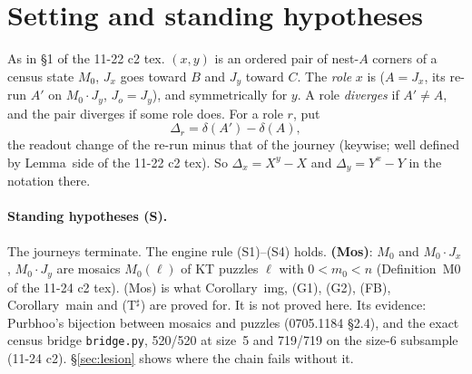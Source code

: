 \documentclass[11pt]{article}
\theoremstyle{definition}\newtheorem{definition}[theorem]{Definition}\newtheorem{remark}[theorem]{Remark}
\begin{document}
\section{Setting and standing hypotheses}\label{sec:set}
As in \S1 of the 11-22 c2 tex. $(x,y)$ is an ordered pair of nest-$A$ corners of a census state $M_0$, $J_x$ goes toward $B$ and $J_y$ toward $C$. The \emph{role} $x$ is ($A=J_x$, its re-run $A'$ on $M_0\cdot J_y$, $J_o=J_y$), and symmetrically for $y$. A role \emph{diverges} if $A'\ne A$, and the pair diverges if some role does. For a role $r$, put
\[\Delta_r=\delta(A')-\delta(A),\]
the readout change of the re-run minus that of the journey (keywise; well defined by Lemma~side of the 11-22 c2 tex). So $\Delta_x=X^y-X$ and $\Delta_y=Y^x-Y$ in the notation there.
\paragraph{Standing hypotheses (S).} The journeys terminate. The engine rule (S1)--(S4) holds. \textbf{(Mos)}: $M_0$ and $M_0\cdot J_x$, $M_0\cdot J_y$ are mosaics $M_0(\ell)$ of KT puzzles $\ell$ with $0<m_0<n$ (Definition~M0 of the 11-24 c2 tex). (Mos) is what Corollary~img, (G1), (G2), (FB), Corollary~main and (T$^\sharp$) are proved for. It is not proved here. Its evidence: Purbhoo's bijection between mosaics and puzzles (0705.1184 \S2.4), and the exact census bridge \texttt{bridge.py}, 520/520 at size~5 and 719/719 on the size-6 subsample (11-24 c2). \S\ref{sec:lesion} shows where the chain fails without it.
\end{document}
